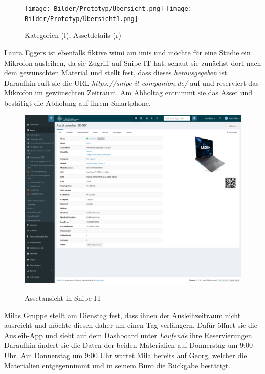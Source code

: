 \begin{figure}[h]
    \centering
    \texttt{[image: Bilder/Prototyp/Übersicht.png]}\hspace{2em}
    \texttt{[image: Bilder/Prototyp/Übersicht1.png]}
    \label{fig:p4}
    \caption[Mockup: Kategorien, Assets, Assetdetails]{Kategorien (l), Assetdetails (r)}
\end{figure}

Laura Eggers ist ebenfalls fiktive \ac{wimi} am \ac{imis} und möchte für eine Studie ein Mikrofon
ausleihen, da sie Zugriff auf Snipe-IT hat, schaut sie zunächst dort nach dem gewünschten Material
und stellt fest, dass dieses \textit{herausgegeben} ist. Daraufhin ruft sie die URL
\textit{https://snipe-it-companion.de/} auf und reserviert das Mikrofon im gewünschten Zeitraum.
Am Abholtag entnimmt sie das Asset und bestätigt die Abholung auf ihrem Smartphone.

\begin{figure}[h]
    \centering
    \includegraphics[scale=0.16]{Bilder/Screenshot 2022-10-14 at 11-26-25 Asset ansehen 00087 Ausleihmanagement.png}
    \label{fig:p4}
    \caption[Assetansicht in Snipe-IT]{Assetansicht in Snipe-IT}
\end{figure}

Milas Gruppe stellt am Dienstag fest, dass ihnen der Ausleihzeitraum nicht ausreicht und möchte
diesen daher um einen Tag verlängern. Dafür öffnet sie die Ausleih-App und sieht auf dem Dashboard
unter \textit{Laufende} ihre Reservierungen. Daraufhin ändert sie die Daten der beiden Materialien
auf Donnerstag um 9:00 Uhr. Am Donnerstag um 9:00 Uhr wartet Mila bereits auf Georg, welcher die
Materialien entgegennimmt und in seinem Büro die Rückgabe bestätigt.


